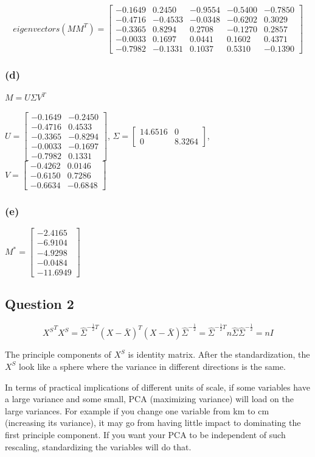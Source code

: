 \documentclass[12pt]{article}
\begin{document}
{\[
eigenvectors(MM^T)
=
\begin{bmatrix}
-0.1649 & 0.2450 & -0.9554 & -0.5400 & -0.7850 \\
-0.4716 & -0.4533 & -0.0348 & -0.6202 & 0.3029 \\
-0.3365 & 0.8294 & 0.2708 & -0.1270 & 0.2857 \\
-0.0033 & 0.1697 & 0.0441 & 0.1602 & 0.4371 \\
-0.7982 & -0.1331 & 0.1037 & 0.5310 & -0.1390
\end{bmatrix}
\]

\subsubsection*{(d)}
$M = U\Sigma V^T$

\medskip
$U=\begin{bmatrix}
-0.1649 & -0.2450 \\
-0.4716 & 0.4533 \\
-0.3365 & -0.8294 \\
-0.0033 & -0.1697 \\
-0.7982 & 0.1331
\end{bmatrix}$, 
$\Sigma=\begin{bmatrix}
14.6516 & 0 \\
0 & 8.3264
\end{bmatrix}$, 
$V=\begin{bmatrix}
-0.4262 & 0.0146 \\
-0.6150 & 0.7286 \\
-0.6634 & -0.6848
\end{bmatrix}$

\subsubsection*{(e)}
$M^*=\begin{bmatrix}
-2.4165 \\
-6.9104 \\
-4.9298 \\
-0.0484 \\
-11.6949
\end{bmatrix}$

\subsection*{Question 2}

$${X^{S}}^{T} X^S = \hat{\Sigma}^{-\frac{1}{2}T}  (X-\bar{X} )^T (X-\bar{X} )  \hat{\Sigma}^{-\frac{1}{2}} = \hat{\Sigma}^{-\frac{1}{2}T} n \hat{\Sigma}  \hat{\Sigma}^{-\frac{1}{2}} = n I
$$

The principle components of $X^S$ is identity matrix. After the standardization, the$X^S$ look like a sphere where the variance in different directions is the same. 

In terms of practical implications of different units of scale, if some variables have a large variance and some small, PCA (maximizing variance) will load on the large variances. For example if you change one variable from km to cm (increasing its variance), it may go from having little impact to dominating the first principle component. If you want your PCA to be independent of such rescaling, standardizing the variables will do that.

}
\end{document}
